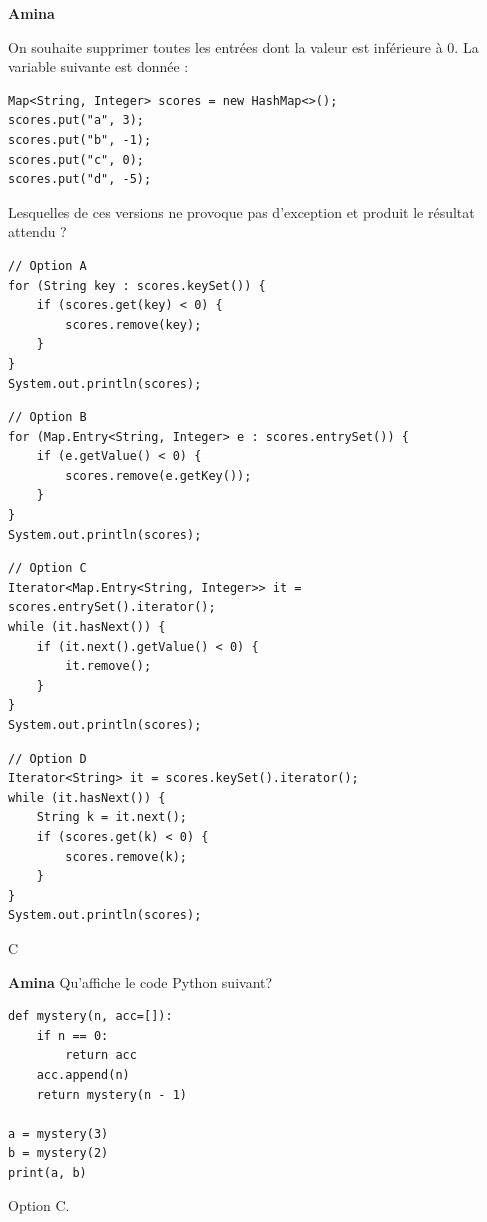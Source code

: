 \begin{Exercice}[5 minutes]\textbf{Amina}

On souhaite supprimer toutes les entrées dont la valeur est inférieure à 0. La variable suivante est donnée :

\begin{lstlisting}[style=javastyle]
Map<String, Integer> scores = new HashMap<>();
scores.put("a", 3);
scores.put("b", -1);
scores.put("c", 0);
scores.put("d", -5);
\end{lstlisting}

Lesquelles de ces versions ne provoque pas d’exception et produit le résultat attendu ?


\begin{lstlisting}[style=javastyle]
// Option A
for (String key : scores.keySet()) {
    if (scores.get(key) < 0) {
        scores.remove(key);
    }
}
System.out.println(scores);
\end{lstlisting}

\begin{lstlisting}[style=javastyle]
// Option B
for (Map.Entry<String, Integer> e : scores.entrySet()) {
    if (e.getValue() < 0) {
        scores.remove(e.getKey());
    }
}
System.out.println(scores);
\end{lstlisting}

\begin{lstlisting}[style=javastyle]
// Option C
Iterator<Map.Entry<String, Integer>> it = scores.entrySet().iterator();
while (it.hasNext()) {
    if (it.next().getValue() < 0) {
        it.remove();
    }
}
System.out.println(scores);
\end{lstlisting}

\begin{lstlisting}[style=javastyle]
// Option D
Iterator<String> it = scores.keySet().iterator();
while (it.hasNext()) {
    String k = it.next();
    if (scores.get(k) < 0) {
        scores.remove(k);
    }
}
System.out.println(scores);
\end{lstlisting}

\begin{solution}
C
\end{solution}

\end{Exercice}

\begin{Exercice}[5 minutes]\textbf{Amina}
Qu'affiche le code Python suivant?

\begin{lstlisting}[style=pythonstyle]
def mystery(n, acc=[]):
    if n == 0:
        return acc
    acc.append(n)
    return mystery(n - 1)

a = mystery(3)
b = mystery(2)
print(a, b)
\end{lstlisting}


\begin{solution}
Option C.
\end{solution}

\end{Exercice}

